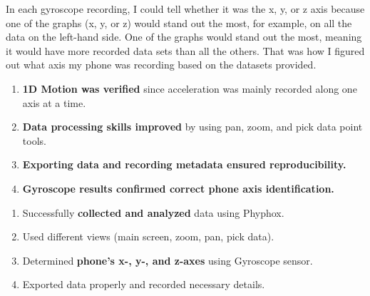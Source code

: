 \documentclass[idxtotoc,hyperref,openany]{labbook} %
\begin{document}

In each gyroscope recording, I could tell whether it was the x, y, or z axis because one of the graphs (x, y, or z) would stand out the most, for example, on all the data on the left-hand side. One of the graphs would stand out the most, meaning it would have more recorded data sets than all the others. That was how I figured out what axis my phone was recording based on the datasets provided.


\begin{enumerate}[$\bullet$]
    \item \textbf{1D Motion was verified} since acceleration was mainly recorded along one axis at a time.
    \item \textbf{Data processing skills improved} by using pan, zoom, and pick data point tools.
    \item \textbf{Exporting data and recording metadata ensured reproducibility.}
    \item \textbf{Gyroscope results confirmed correct phone axis identification.}
\end{enumerate}


\begin{enumerate}[$\bullet$]
    \item \checkmark \hspace{1mm} Successfully \textbf{collected and analyzed} data using Phyphox.
    \item \checkmark \hspace{1mm} Used different views (main screen, zoom, pan, pick data).
    \item \checkmark \hspace{1mm} Determined \textbf{phone’s x-, y-, and z-axes} using Gyroscope sensor.
    \item \checkmark \hspace{1mm} Exported data properly and recorded necessary details.
\end{enumerate}

\end{document}
